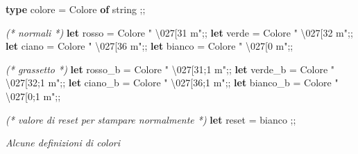 \documentclass[11pt]{article}
\newenvironment{Shaded}{}{}
\newcommand{\KeywordTok}[1]{\textcolor[rgb]{0.00,0.44,0.13}{\textbf{{#1}}}}
\newcommand{\DataTypeTok}[1]{\textcolor[rgb]{0.56,0.13,0.00}{{#1}}}
\newcommand{\CharTok}[1]{\textcolor[rgb]{0.25,0.44,0.63}{{#1}}}
\newcommand{\StringTok}[1]{\textcolor[rgb]{0.25,0.44,0.63}{{#1}}}
\newcommand{\CommentTok}[1]{\textcolor[rgb]{0.38,0.63,0.69}{\textit{{#1}}}}
\newcommand{\NormalTok}[1]{{#1}}
\begin{document}
    \begin{Shaded}
\begin{Highlighting}[]
\KeywordTok{type}\NormalTok{ colore = Colore }\KeywordTok{of} \DataTypeTok{string}\NormalTok{ ;;}

\CommentTok{(* normali *)}
\KeywordTok{let}\NormalTok{ rosso = Colore }\StringTok{" }\CharTok{\textbackslash{}027}\StringTok{[31 m"}\NormalTok{;;}
\KeywordTok{let}\NormalTok{ verde = Colore }\StringTok{" }\CharTok{\textbackslash{}027}\StringTok{[32 m"}\NormalTok{;;}
\KeywordTok{let}\NormalTok{ ciano = Colore }\StringTok{" }\CharTok{\textbackslash{}027}\StringTok{[36 m"}\NormalTok{;;}
\KeywordTok{let}\NormalTok{ bianco = Colore }\StringTok{" }\CharTok{\textbackslash{}027}\StringTok{[0 m"}\NormalTok{;;}

\CommentTok{(* grassetto *)}
\KeywordTok{let}\NormalTok{ rosso\_b = Colore }\StringTok{" }\CharTok{\textbackslash{}027}\StringTok{[31;1 m"}\NormalTok{;;}
\KeywordTok{let}\NormalTok{ verde\_b = Colore }\StringTok{" }\CharTok{\textbackslash{}027}\StringTok{[32;1 m"}\NormalTok{;;}
\KeywordTok{let}\NormalTok{ ciano\_b = Colore }\StringTok{" }\CharTok{\textbackslash{}027}\StringTok{[36;1 m"}\NormalTok{;;}
\KeywordTok{let}\NormalTok{ bianco\_b = Colore }\StringTok{" }\CharTok{\textbackslash{}027}\StringTok{[0;1 m"}\NormalTok{;;}

\CommentTok{(* valore di reset per stampare normalmente *)}
\KeywordTok{let}\NormalTok{ reset = bianco ;;}
\end{Highlighting}
\end{Shaded}

\emph{Alcune definizioni di colori}
\end{document}
